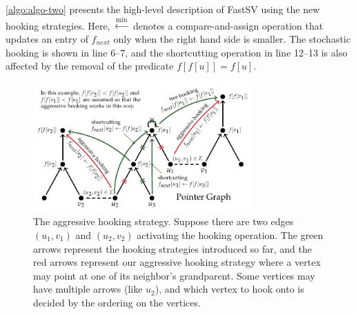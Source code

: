 \documentclass{sokendai_thesis} %
\begin{document}
\autoref{algo:algo-two} presents the high-level description of FastSV using the new hooking strategies.
Here, $\xleftarrow{\min}$ denotes a compare-and-assign operation that updates an entry of $f_{\mathit{next}}$ only when the right hand side is smaller.
The stochastic hooking is shown in line 6--7, and the shortcutting operation in line 12--13 is also affected by the removal of the predicate $f[f[u]]=f[u]$.



\begin{figure}
\centering
\includegraphics[width=0.75\textwidth]{figures/aggressive.pdf}
\caption{The aggressive hooking strategy.
Suppose there are two edges $(u_1,v_1)$ and $(u_2,v_2)$ activating the hooking operation.
The green arrows represent the hooking strategies introduced so far, and the red arrows represent our aggressive hooking strategy where a vertex may point at one of its neighbor's grandparent.
Some vertices may have multiple arrows (like $u_2$), and which vertex to hook onto is decided by the ordering on the vertices.}
\label{fig:aggressive}
\vspace{-10pt}
\end{figure}
\end{document}
